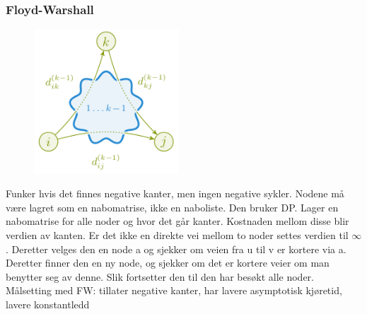 \documentclass[12pt]{report}
\begin{document}
\begin{multicols}{2}


\end{multicols}
\paragraph*{ }

\vspace{\baselineskip}

\vspace{\baselineskip}\subsubsection*{Floyd-Warshall}



\begin{figure}[H]
\advance\leftskip 5.12in		\includegraphics[width=2.14in,height=2.13in]{./media/image134.png}
\end{figure}



\setlength{\parskip}{10.56pt}
Funker hvis det finnes negative kanter, men ingen negative sykler. Nodene må være lagret som en nabomatrise, ikke en naboliste. Den bruker DP. Lager en nabomatrise for alle noder og hvor det går kanter. Kostnaden mellom disse blir verdien av kanten. Er det ikke en direkte vei mellom to noder settes verdien til $\infty$ . Deretter velges den en node a og sjekker om veien fra u til v er kortere via a. Deretter finner den en ny node, og sjekker om det er kortere veier om man benytter seg av denne. Slik fortsetter den til den har besøkt alle noder. Målsetting med FW: tillater negative kanter, har lavere \tab  asymptotisk kjøretid, lavere konstantledd\par
\end{document}

